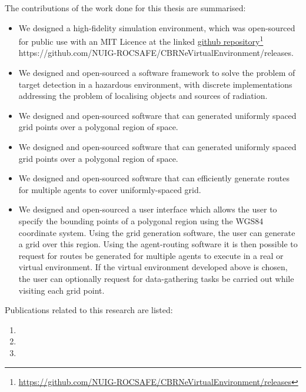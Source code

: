 The contributions of the work done for this thesis are summarised:
\begin{itemize}
    \item We designed a high-fidelity simulation environment, which was open-sourced for public use with an MIT Licence at the linked \href{https://github.com/NUIG-ROCSAFE/CBRNeVirtualEnvironment/releases}{github repository}\footnote{\href {https://github.com/NUIG-ROCSAFE/CBRNeVirtualEnvironment/releases}{https://github.com/NUIG-ROCSAFE/CBRNeVirtualEnvironment/releases}} https://github.com/NUIG-ROCSAFE/CBRNeVirtualEnvironment/releases.
    \item We designed and open-sourced a software framework to solve the problem of target detection in a hazardous environment, with discrete implementations addressing the problem of localising objects and sources of radiation.
    \item We designed and open-sourced software that can generated uniformly spaced grid points over a polygonal region of space.
    \item We designed and open-sourced software that can generated uniformly spaced grid points over a polygonal region of space.
    \item We designed and open-sourced software that can efficiently generate routes for multiple agents to cover uniformly-spaced grid.
    \item We designed and open-sourced a user interface which allows the user to specify the bounding points of a polygonal region using the WGS84 coordinate system. Using the grid generation  software, the user can generate a grid over this region. Using the agent-routing software it is then possible to request for routes be generated for multiple agents to execute in a real or virtual environment. If the virtual environment developed above is chosen, the user can optionally request for data-gathering tasks be carried out while visiting each grid point.
\end{itemize}

Publications related to this research are listed:
\begin{enumerate}
    \item {}
    \item {}
    \item {}

\end{enumerate}